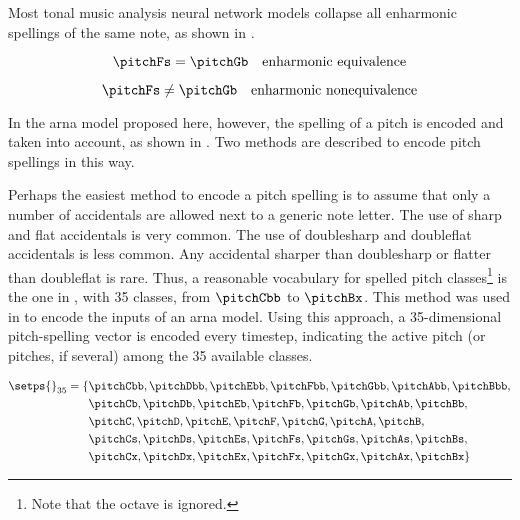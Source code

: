 
Most tonal music analysis neural network models collapse all
enharmonic spellings of the same note, as shown in
.

\begin{equation}
    \label{eq:enharmonic_equivalence}
    \pitchFs = \pitchGb \quad \text{enharmonic equivalence}
\end{equation}

\begin{equation}
    \label{eq:enharmonic_nonequivalence}
    \pitchFs \neq \pitchGb \quad \text{enharmonic nonequivalence}
\end{equation}

In the \gls{arna} model proposed here, however, the spelling
of a pitch is encoded and taken into account, as shown in
. Two methods are described
to encode pitch spellings in this way.



Perhaps the easiest method to encode a pitch spelling is to
assume that only a number of accidentals are allowed next to
a generic note letter. The use of \gls{sharp} and \gls{flat}
accidentals is very common. The use of \gls{doublesharp} and
\gls{doubleflat} accidentals is less common. Any accidental
sharper than \gls{doublesharp} or flatter than
\gls{doubleflat} is rare. Thus, a reasonable vocabulary for
spelled pitch classes\footnote{Note that the octave is
ignored.} is the one in , with 35
classes, from $\pitchCbb$ to $\pitchBx$. This method was
used in \textcite{micchi2020not, micchi2021deep} to encode
the inputs of an \gls{arna} model. Using this approach, a
35-dimensional pitch-spelling vector is encoded every
timestep, indicating the active pitch (or pitches, if
several) among the 35 available classes.

\begin{equation}
    \label{eq:pitch_spelling_35}
    \begin{split}
    \setps{}_{35} = \{ & \pitchCbb, \pitchDbb, \pitchEbb, \pitchFbb, \pitchGbb, \pitchAbb, \pitchBbb, \\
    & \pitchCb, \pitchDb, \pitchEb, \pitchFb, \pitchGb, \pitchAb, \pitchBb, \\
    & \pitchC, \pitchD, \pitchE, \pitchF, \pitchG, \pitchA, \pitchB, \\
    & \pitchCs, \pitchDs, \pitchEs, \pitchFs, \pitchGs, \pitchAs, \pitchBs, \\
    & \pitchCx, \pitchDx, \pitchEx, \pitchFx, \pitchGx, \pitchAx, \pitchBx \}
    \end{split}
\end{equation}

